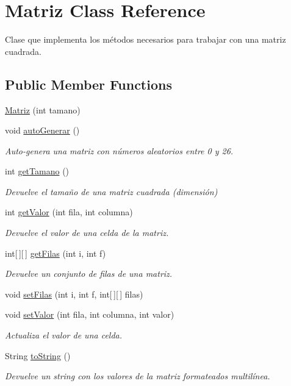 \hypertarget{classMatriz}{\section{Matriz Class Reference}
\label{classMatriz}
}


Clase que implementa los métodos necesarios para trabajar con una matriz cuadrada.  


\subsection*{Public Member Functions}
\begin{DoxyCompactItemize}
\item 
\hyperlink{classMatriz_a5300a2e433d2a0ce0f7a18879591ba44}{Matriz} (int tamano)
\item 
void \hyperlink{classMatriz_a4951dffed918ec71ccfc4da71df8d155}{auto\-Generar} ()
\begin{DoxyCompactList}\small\item\em Auto-\/genera una matriz con números aleatorios entre 0 y 26. \end{DoxyCompactList}\item 
int \hyperlink{classMatriz_ac7480742c1df8a3b165e2bb55006310d}{get\-Tamano} ()
\begin{DoxyCompactList}\small\item\em Devuelve el tamaño de una matriz cuadrada (dimensión) \end{DoxyCompactList}\item 
int \hyperlink{classMatriz_aff57f6720c62264098b013f66960508f}{get\-Valor} (int fila, int columna)
\begin{DoxyCompactList}\small\item\em Devuelve el valor de una celda de la matriz. \end{DoxyCompactList}\item 
int\mbox{[}$\,$\mbox{]}\mbox{[}$\,$\mbox{]} \hyperlink{classMatriz_af39eb808f24e4800ffa1ff55925a4fb8}{get\-Filas} (int i, int f)
\begin{DoxyCompactList}\small\item\em Devuelve un conjunto de filas de una matriz. \end{DoxyCompactList}\item 
void \hyperlink{classMatriz_ac9734934460836b625f8d5a5c7366f2f}{set\-Filas} (int i, int f, int\mbox{[}$\,$\mbox{]}\mbox{[}$\,$\mbox{]} filas)
\item 
void \hyperlink{classMatriz_ab7372f0c680fb3f3fd36a1135ce920e9}{set\-Valor} (int fila, int columna, int valor)
\begin{DoxyCompactList}\small\item\em Actualiza el valor de una celda. \end{DoxyCompactList}\item 
String \hyperlink{classMatriz_aa9b4976a362e4934844158edcba9cdd0}{to\-String} ()
\begin{DoxyCompactList}\small\item\em Devuelve un string con los valores de la matriz formateados multilínea. \end{DoxyCompactList}\end{DoxyCompactItemize}


